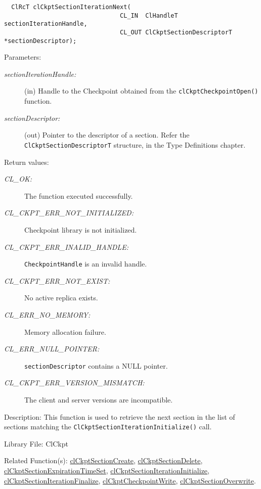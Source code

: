\begin{flushleft}
\begin{Desc}
\footnotesize\begin{verbatim}  ClRcT clCkptSectionIterationNext(
                     			CL_IN  ClHandleT   sectionIterationHandle,
                     			CL_OUT ClCkptSectionDescriptorT *sectionDescriptor);
\end{verbatim}
\normalsize
\end{Desc}
\begin{Desc}
\item[Parameters:]
\begin{description}
\item[{\em section\-Iteration\-Handle:}](in) Handle to the Checkpoint obtained from the {\tt{clCkptCheckpointOpen()}} function. 
\item[{\em section\-Descriptor:}](out) Pointer to the descriptor of a section. Refer the {\tt{ClCkptSectionDescriptorT}} structure, in the Type 
Definitions chapter.
\end{description}
\end{Desc}
\begin{Desc}
\item[Return values:]
\begin{description}
\item[{\em CL\_\-OK:}]The function executed successfully.
\item[{\em CL\_\-CKPT\_\-ERR\_\-NOT\_\-INITIALIZED:}]Checkpoint library is not initialized. 
\item[{\em CL\_\-CKPT\_\-ERR\_\-INALID\_\-HANDLE:}]{\tt{CheckpointHandle}} is an invalid handle.
\item[{\em CL\_\-CKPT\_\-ERR\_\-NOT\_\-EXIST:}] No active replica exists.
\item[{\em CL\_\-ERR\_\-NO\_\-MEMORY:}]Memory allocation failure.
\item[{\em CL\_\-ERR\_\-NULL\_\-POINTER:}]{\tt{sectionDescriptor}} contains a NULL pointer.
\item[{\em CL\_\-CKPT\_\-ERR\_\-VERSION\_\-MISMATCH:}]The client and server versions are incompatible.

\end{description}
\end{Desc}
\begin{Desc}
\item[Description:]This function is used to retrieve the next section in the list of sections matching the 
{\tt{ClCkptSectionIterationInitialize()}} call.\end{Desc}
\begin{Desc}
\item[Library File:]Cl\-Ckpt\end{Desc}
\begin{Desc}
\item[Related Function(s):]\hyperlink{pageckpt110}{cl\-Ckpt\-Section\-Create}, \hyperlink{pageckpt111}{cl\-Ckpt\-Section\-Delete}, 
\hyperlink{pageckpt112}{cl\-Ckpt\-Section\-Expiration\-Time\-Set}, \hyperlink{pageckpt113}{cl\-Ckpt\-Section\-Iteration\-Initialize}, 
\hyperlink{pageckpt115}{cl\-Ckpt\-Section\-Iteration\-Finalize}, \hyperlink{pageckpt116}{cl\-Ckpt\-Checkpoint\-Write}, 
\hyperlink{pageckpt117}{cl\-Ckpt\-Section\-Overwrite}. \end{Desc}
\newpage



\end{flushleft}

